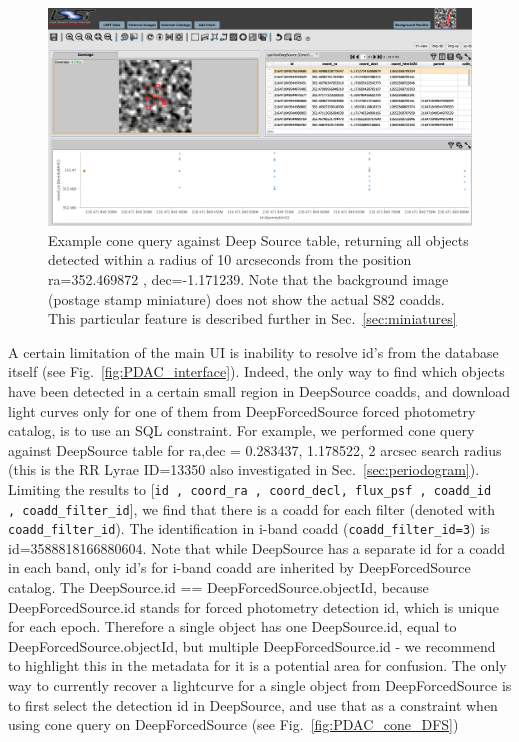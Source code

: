 \documentclass[DM,lsstdraft,toc,usenatbib]{lsstdoc}
\begin{document}
\begin{figure}
\includegraphics[width=\textwidth]{figs/3_PDAC_cone_DeepSource}
\caption{Example cone query against Deep Source table, returning all objects detected within a radius of 10 arcseconds from the position ra=352.469872 , dec=-1.171239. Note that the background image (postage stamp miniature) does not show the actual S82 coadds. This particular feature is described further in Sec.~\ref{sec:miniatures}}
\label{fig:PDAC_cone_DS}
\end{figure}

A certain limitation of the main UI is inability to resolve id's from the database itself (see Fig.~\ref{fig:PDAC_interface}). Indeed, the only way to find which objects have been detected in a certain small region in DeepSource coadds, and download light curves only for one of them  from DeepForcedSource forced photometry catalog, is  to use an  SQL constraint.   For example,  we performed cone query against DeepSource table for ra,dec = 0.283437, 1.178522, 2 arcsec search radius (this is the RR Lyrae ID=13350 also investigated in Sec.~\ref{sec:periodogram}). Limiting the results to [\verb|id , coord_ra , coord_decl, flux_psf , coadd_id  , coadd_filter_id|], we find that there is a coadd for each filter (denoted with \verb|coadd_filter_id|). The identification in i-band coadd (\verb|coadd_filter_id=3|) is id=3588818166880604.  Note that while DeepSource has a separate id for a coadd in each band, only id's for  i-band coadd are inherited by DeepForcedSource  catalog. The DeepSource.id == DeepForcedSource.objectId,  because  DeepForcedSource.id  stands for forced photometry detection id, which is unique for each epoch. Therefore a single object has one DeepSource.id,  equal to DeepForcedSource.objectId, but  multiple  DeepForcedSource.id  - we recommend to highlight this in the metadata for it is a potential area for confusion. The only way to currently recover a lightcurve for a single object from DeepForcedSource is to  first select the detection id  in DeepSource, and use that as a constraint when using cone query  on DeepForcedSource (see Fig.~\ref{fig:PDAC_cone_DFS})
\end{document}
